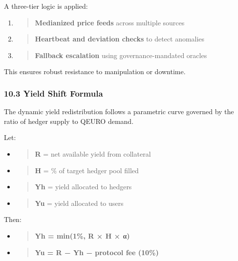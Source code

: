 A three-tier logic is applied:

\begin{enumerate}
\def\labelenumi{\arabic{enumi}.}
\item
  \begin{quote}
  \textbf{Medianized price feeds} across multiple sources
  \end{quote}
\item
  \begin{quote}
  \textbf{Heartbeat and deviation checks} to detect anomalies
  \end{quote}
\item
  \begin{quote}
  \textbf{Fallback escalation} using governance-mandated oracles
  \end{quote}
\end{enumerate}

This ensures robust resistance to manipulation or downtime.

\hypertarget{yield-shift-formula}{%
\subsubsection{10.3 Yield Shift Formula}\label{yield-shift-formula}}

The dynamic yield redistribution follows a parametric curve governed by
the ratio of hedger supply to QEURO demand.

Let:

\begin{itemize}
\item
  \begin{quote}
  \textbf{R} = net available yield from collateral
  \end{quote}
\item
  \begin{quote}
  \textbf{H} = \% of target hedger pool filled
  \end{quote}
\item
  \begin{quote}
  \textbf{Yh} = yield allocated to hedgers
  \end{quote}
\item
  \begin{quote}
  \textbf{Yu} = yield allocated to users
  \end{quote}
\end{itemize}

Then:

\begin{itemize}
\item
  \begin{quote}
  \textbf{Yh = min(1\%, R × H × α)}
  \end{quote}
\item
  \begin{quote}
  \textbf{Yu = R − Yh − protocol fee (10\%)}
  \end{quote}
\end{itemize}

